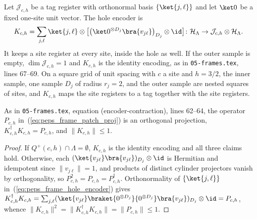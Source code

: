 \begin{definition}
    \label{def:peps_frame_hole_encoder}
    \leanok
    Let $\mathcal J_{c,h}$ be a tag register with orthonormal basis
    $\{\ket{j,\ell}\}$ and let $\ket0$ be a fixed one-site unit vector. The
    hole encoder is
    \begin{align}
        K_{c,h}=\sum_{j,\ell}\ket{j,\ell}\otimes
        \bigl[\bigl(\ket0^{\otimes D_j}\bra{v_{j\ell}}\bigr)_{D_j}
            \otimes\id\bigr]
        \colon\mathcal H_\Lambda\to\mathcal J_{c,h}\otimes\mathcal H_\Lambda .
        \label{eq:peps_frame_hole_encoder}
    \end{align}
    It keeps a site register at every site, inside the hole as well. If the
    outer sample is empty, $\dim\mathcal J_{c,h}=1$ and $K_{c,h}$
    is the identity encoding, as in \texttt{05-frames.tex}, lines 67--69.
    On a square grid of unit spacing with $c$ a site and $h=3/2$, the inner
    sample, one sample $D_j$ of radius $r_j=2$, and the outer sample are
    nested squares of sites, and $K_{c,h}$ maps the site registers to a tag
    together with the site registers.
    
    
\end{definition}

\begin{lemma}
    \label{lem:peps_frame_encoder_contraction}
    \leanok
    As in \texttt{05-frames.tex}, equation (encoder-contraction),
    lines 62--64, the operator $P_{c,h}$ in~(\ref{eq:peps_frame_patch_proj}) is an orthogonal projection,
    $K_{c,h}^\dagger K_{c,h}=P_{c,h}$, and $\lVert K_{c,h}\rVert\le1$.
\end{lemma}

\begin{proof}\leanok
    If $Q^+(c,h)\cap\Lambda=\emptyset$, $K_{c,h}$ is the identity encoding and all
    three claims hold. Otherwise, each $(\ket{v_{j\ell}}\bra{v_{j\ell}})_{D_j}\otimes\id$ is Hermitian
    and idempotent since $\lVert v_{j\ell}\rVert=1$, and products of distinct cylinder projectors vanish by
    orthogonality, so $P_{c,h}^2=P_{c,h}=P_{c,h}^\dagger$. Orthonormality
    of $\{\ket{j,\ell}\}$ in~(\ref{eq:peps_frame_hole_encoder}) gives
    $K_{c,h}^\dagger K_{c,h}=\sum_{j,\ell}
        (\ket{v_{j\ell}}\braket{0^{\otimes D_j}}{0^{\otimes D_j}}\bra{v_{j\ell}})_{D_j}
        \otimes\id=P_{c,h}$, whence
    $\lVert K_{c,h}\rVert^2=\lVert K_{c,h}^\dagger K_{c,h}\rVert
        =\lVert P_{c,h}\rVert\le1$.
\end{proof}

